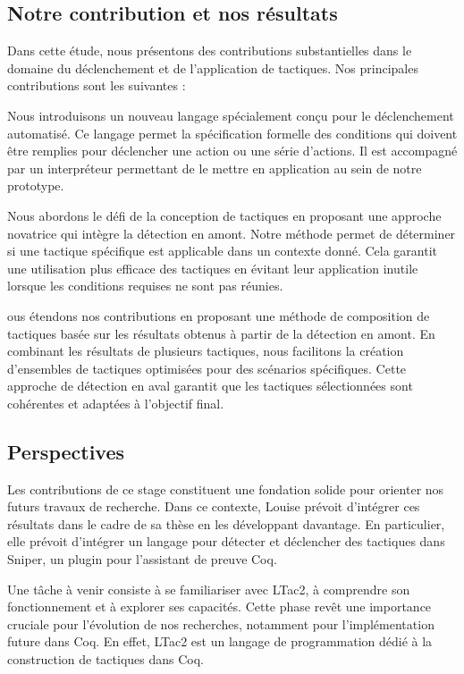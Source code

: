 \documentclass[french,titlepage]{article}
\begin{document}
\subsection{Notre contribution et nos résultats}
Dans cette étude, nous présentons des contributions substantielles dans le domaine du déclenchement et de l'application de tactiques. Nos principales contributions sont les suivantes :

Nous introduisons un nouveau langage spécialement conçu pour le déclenchement automatisé. Ce langage permet la spécification formelle des conditions qui doivent être remplies pour déclencher une action ou une série d'actions. Il est accompagné par un interpréteur permettant de le mettre en application au sein de notre prototype.

Nous abordons le défi de la conception de tactiques en proposant une approche novatrice qui intègre la détection en amont. Notre méthode permet de déterminer si une tactique spécifique est applicable dans un contexte donné. Cela garantit une utilisation plus efficace des tactiques en évitant leur application inutile lorsque les conditions requises ne sont pas réunies.

ous étendons nos contributions en proposant une méthode de composition de tactiques basée sur les résultats obtenus à partir de la détection en amont. En combinant les résultats de plusieurs tactiques, nous facilitons la création d'ensembles de tactiques optimisées pour des scénarios spécifiques. Cette approche de détection en aval garantit que les tactiques sélectionnées sont cohérentes et adaptées à l'objectif final.

\subsection{Perspectives}
Les contributions de ce stage constituent une fondation solide pour orienter nos futurs travaux de recherche. Dans ce contexte, Louise prévoit d'intégrer ces résultats dans le cadre de sa thèse en les développant davantage. En particulier, elle prévoit d'intégrer un langage pour détecter et déclencher des tactiques dans Sniper, un plugin pour l'assistant de preuve Coq.

Une tâche à venir consiste à se familiariser avec LTac2, à comprendre son fonctionnement et à explorer ses capacités. Cette phase revêt une importance cruciale pour l'évolution de nos recherches, notamment pour l'implémentation future dans Coq. En effet, LTac2 est un langage de programmation dédié à la construction de tactiques dans Coq.
\end{document}
